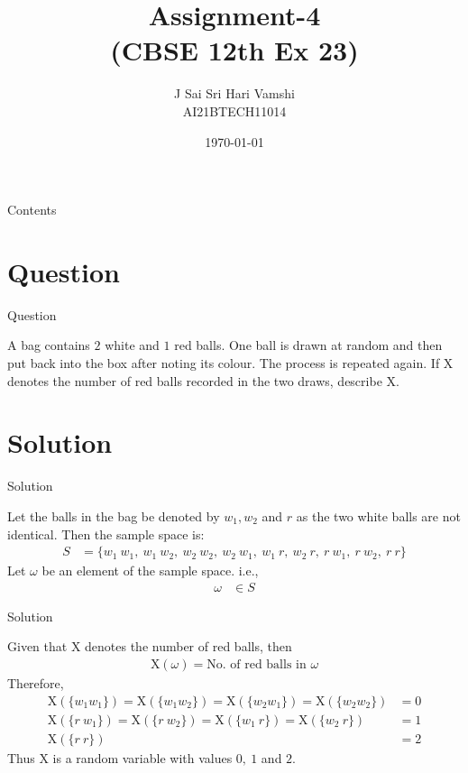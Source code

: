 \documentclass{beamer}
\title{Assignment-4\\(CBSE 12th Ex 23)}
\author{J Sai Sri Hari Vamshi\\ AI21BTECH11014}
\date{\today}
\providecommand{\x}[1]{\ensuremath{\text{X}\left(#1\right)}}
\begin{document}
\begin{frame}
    \titlepage 
\end{frame}



\begin{frame}{Contents}
    \tableofcontents
\end{frame}

\section{Question}
\begin{frame}{Question}

A bag contains $2$ white and $1$ red balls. One ball is drawn at random and then put back into the box after noting its colour. The process is repeated again. If X denotes the number of red balls recorded in the two draws, describe X.

\end{frame}

\section{Solution}
\begin{frame}{Solution}

Let the balls in the bag be denoted by $w_1, w_2$ and $r$ as the two white balls are not identical.
Then the sample space is:
	\begin{align*}
		S & = \{w_1\ w_1,\ w_1\ w_2,\ w_2\ w_2,\ w_2\ w_1,\ w_1\ r,\ w_2\ r,\ r\ w_1,\ r\ w_2,\ r\ r\}
	\end{align*}
Let $\omega$ be an element of the sample space. i.e.,
	\begin{align*}
		\omega & \in S
	\end{align*}
\end{frame}

\begin{frame}{Solution}

Given that X denotes the number of red balls, then 
	\begin{align*}
	\x{\omega} = \text{No. of red balls in }\omega
	\end{align*}
Therefore,
	\begin{align*}
	\x{\{w_1 w_1\}} = \x{\{w_1 w_2\}} = \x{\{w_2 w_1\}} = \x{\{w_2 w_2\}} & = 0\\
	\x{\{r\ w_1\}} = \x{\{r\ w_2\}} = \x{\{w_1\ r\}} = \x{\{w_2\ r\}} & = 1\\
	\x{\{r\ r\}} & = 2
	\end{align*}
Thus X is a random variable with values $0,\ 1$ and $2$.

\end{frame}
\end{document}
